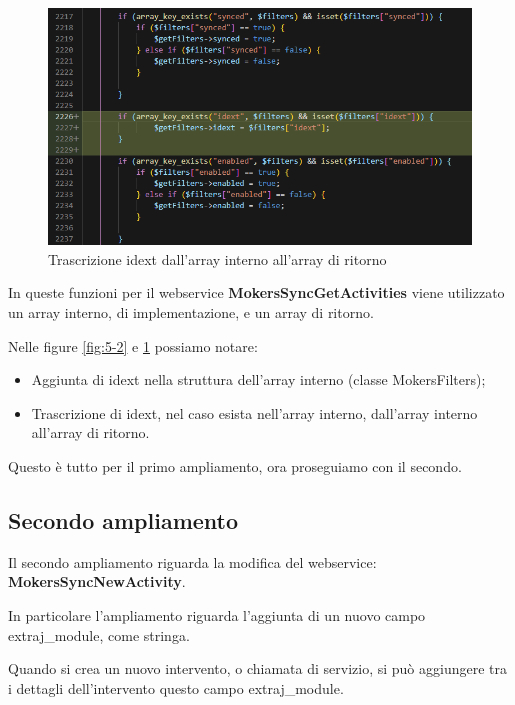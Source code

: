 \begin{figure}[!h] 
	\centering
	\includegraphics[scale = 0.5]{immagini/webservices/ampliamenti/1ampl_mokers_getidext.png}
	\caption{Trascrizione idext dall'array interno all'array di ritorno}
	\label{fig:5-3}
\end{figure}
\newspace
\newspace

	In queste funzioni per il webservice \textbf{MokersSyncGetActivities} viene utilizzato un array interno, di implementazione, e un array di ritorno.
	
	Nelle figure \ref{fig:5-2} e \ref{fig:5-3} possiamo notare:
	\begin{itemize}
		\item Aggiunta di idext nella struttura dell'array interno (classe MokersFilters);
		\item Trascrizione di idext, nel caso esista nell'array interno, dall'array interno all'array di ritorno.
	\end{itemize}
	
	Questo è tutto per il primo ampliamento, ora proseguiamo con il secondo.

\newpage

\subsection{Secondo ampliamento}
Il secondo ampliamento riguarda la modifica del webservice: \\ \textbf{MokersSyncNewActivity}.


	In particolare l'ampliamento riguarda l'aggiunta di un nuovo campo extraj\_module, come  stringa.
	
	Quando si crea un nuovo intervento, o chiamata di servizio, si può aggiungere tra i dettagli dell'intervento questo campo extraj\_module.
	
